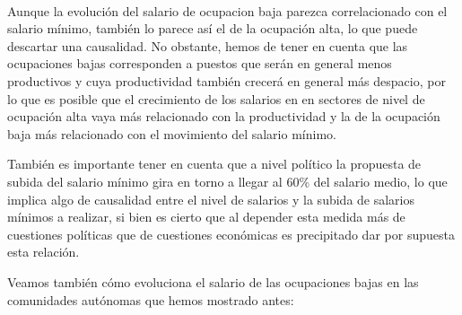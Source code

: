 \documentclass[11pt]{article}
\begin{document}
    \begin{center}
    \end{center}
    { \hspace*{\fill} \\}
    
    Aunque la evolución del salario de ocupacion baja parezca correlacionado
con el salario mínimo, también lo parece así el de la ocupación alta, lo
que puede descartar una causalidad. No obstante, hemos de tener en
cuenta que las ocupaciones bajas corresponden a puestos que serán en
general menos productivos y cuya productividad también crecerá en
general más despacio, por lo que es posible que el crecimiento de los
salarios en en sectores de nivel de ocupación alta vaya más relacionado
con la productividad y la de la ocupación baja más relacionado con el
movimiento del salario mínimo.

También es importante tener en cuenta que a nivel político la propuesta
de subida del salario mínimo gira en torno a llegar al 60\% del salario
medio, lo que implica algo de causalidad entre el nivel de salarios y la
subida de salarios mínimos a realizar, si bien es cierto que al depender
esta medida más de cuestiones políticas que de cuestiones económicas es
precipitado dar por supuesta esta relación.

Veamos también cómo evoluciona el salario de las ocupaciones bajas en
las comunidades autónomas que hemos mostrado antes:
\end{document}
